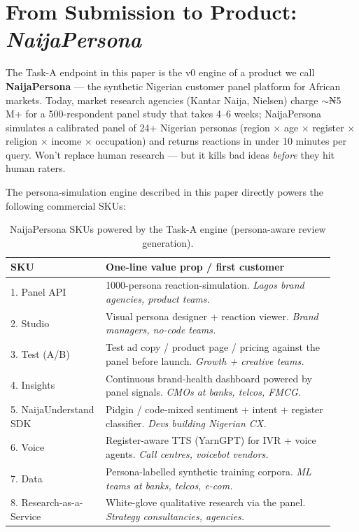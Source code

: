 \documentclass[sigconf,nonacm,balance]{acmart}
\begin{document}
\section{From Submission to Product: \emph{NaijaPersona}}
\label{sec:product}

The Task-A endpoint in this paper is the v0 engine of a product we call
\textbf{NaijaPersona} --- the synthetic Nigerian customer panel platform
for African markets. Today, market research agencies (Kantar Naija,
Nielsen) charge $\sim$₦5\,M+ for a 500-respondent panel study that
takes 4--6 weeks; NaijaPersona simulates a calibrated panel of 24+
Nigerian personas (region $\times$ age $\times$ register $\times$
religion $\times$ income $\times$ occupation) and returns reactions in
under 10 minutes per query. Won't replace human research --- but it
kills bad ideas \emph{before} they hit human raters.

The persona-simulation engine described in this paper directly powers
the following commercial SKUs:

\begin{table}[t]
\caption{NaijaPersona SKUs powered by the Task-A engine
         (persona-aware review generation).}
\label{tab:naijapersona-skus-a}
\small
\begin{tabular}{p{0.27\linewidth}p{0.65\linewidth}}
\toprule
\textbf{SKU} & \textbf{One-line value prop / first customer} \\
\midrule
1. Panel API & 1000-persona reaction-simulation. \emph{Lagos brand agencies, product teams.} \\
2. Studio & Visual persona designer + reaction viewer. \emph{Brand managers, no-code teams.} \\
3. Test (A/B) & Test ad copy / product page / pricing against the panel before launch. \emph{Growth + creative teams.} \\
4. Insights & Continuous brand-health dashboard powered by panel signals. \emph{CMOs at banks, telcos, FMCG.} \\
5. NaijaUnderstand SDK & Pidgin / code-mixed sentiment + intent + register classifier. \emph{Devs building Nigerian CX.} \\
6. Voice & Register-aware TTS (YarnGPT) for IVR + voice agents. \emph{Call centres, voicebot vendors.} \\
7. Data & Persona-labelled synthetic training corpora. \emph{ML teams at banks, telcos, e-com.} \\
8. Research-as-a-Service & White-glove qualitative research via the panel. \emph{Strategy consultancies, agencies.} \\
\bottomrule
\end{tabular}
\end{table}
\end{document}
